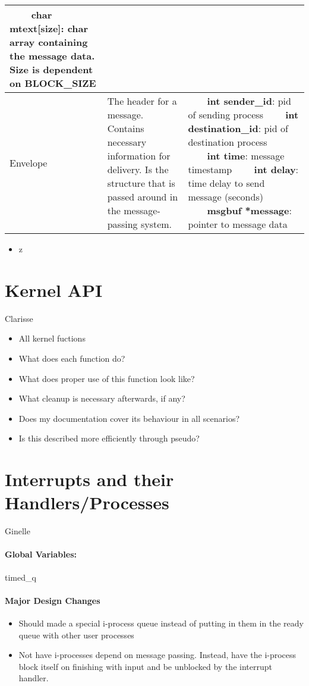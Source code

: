 \documentclass[11pt, oneside]{article}
\newcommand{\tabitem}{~~\llap{\textbullet}~~}
\begin{document}
\begin{description}
\begin{longtable}{|L{2cm}|L{5cm}|L{5cm}|}
\tabitem \textbf{char mtext[size]}: char array containing the message data. Size is dependent on BLOCK\_SIZE\\ \hline
Envelope&The header for a message. Contains necessary information for delivery. Is the structure that is passed around in the message-passing system.&
\tabitem \textbf{int sender\_id}: pid of sending process \newline
\tabitem \textbf{int destination\_id}: pid of destination process \newline
\tabitem \textbf{int time}: message timestamp \newline
\tabitem \textbf{int delay}: time delay to send message (seconds) \newline
\tabitem \textbf{msgbuf *message}: pointer to message data \newline
\\ \hline 
\end{longtable}
\begin{itemize}
\item z
\end{itemize}
\end{description}

\section{Kernel API}
Clarisse
\begin{itemize}
\item All kernel fuctions
\item What does each function do?
\item What does proper use of this function look like?
\item What cleanup is necessary afterwards, if any?
\item Does my documentation cover its behaviour in all scenarios?
\item Is this described more efficiently through pseudo?
\end{itemize}

\section{Interrupts and their Handlers/Processes}
Ginelle

\paragraph{Global Variables:}
timed\_q

\paragraph{Major Design Changes}
\begin{itemize}
\item
Should made a special i-process queue instead of putting in them in the ready queue with other user processes
\item
Not have i-processes depend on message passing. Instead, have the i-process block itself on finishing with input and be unblocked by the interrupt handler. 
\end{itemize}
\end{document}
